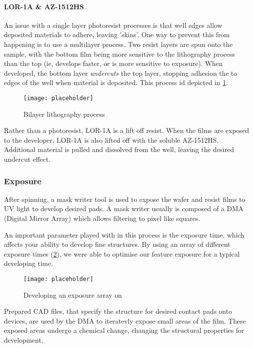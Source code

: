 \documentclass[../../Matt_Gebert_Honours_Thesis.tex]{subfiles}
\begin{document}
	\paragraph{LOR-1A \& AZ-1512HS}
	An issue with a single layer photoresist processes is that well edges allow deposited materials to adhere, leaving 'skins'. One way to prevent this from happening is to use a multilayer process. Two resist layers are spun onto the sample, with the bottom film being more sensitive to the lithography process than the top (ie, develops faster, or is more sensitive to exposure). When developed, the bottom layer \textit{undercuts} the top layer, stopping adhesion the to edges of the well when material is deposited. This process id depicted in \cref{fig:bilayer_lithography}.
	
	\begin{figure}[H]
		\centering
		\texttt{[image: placeholder]}
		\caption{Bilayer lithography process}\label{fig:bilayer_lithography}
	\end{figure}
	
	Rather than a photoresist, LOR-1A is a lift off resist. When the films are exposed to the developer, LOR-1A is also lifted off with the soluble AZ-1512HS. Additional material is pulled and dissolved from the well, leaving the desired undercut effect. %
	
	\subsubsection{Exposure}\label{sec:exposure}
	After spinning, a mask writer tool is used to expose the wafer and resist films to UV light to develop desired pads. A mask writer usually is composed of a DMA (Digital Mirror Array) which allows filtering to pixel like squares. %
	
	An important parameter played with in this process is the exposure time, which affects your ability to develop fine structures. By using an array of different exposure times (\cref{fig:exposure_array}), we were able to optimise our feature exposure for a typical developing time.
	
	\begin{figure}[H]
		\centering
		\texttt{[image: placeholder]}
		\caption{Developing an exposure array on \silicondioxide}\label{fig:exposure_array}
	\end{figure}
	
	Prepared CAD files, that specify the structure for desired contact pads onto devices, are used by the DMA to iteratevly expose small areas of the film. These exposed areas undergo a chemical change, changing the structural properties for development.
	
\end{document}
